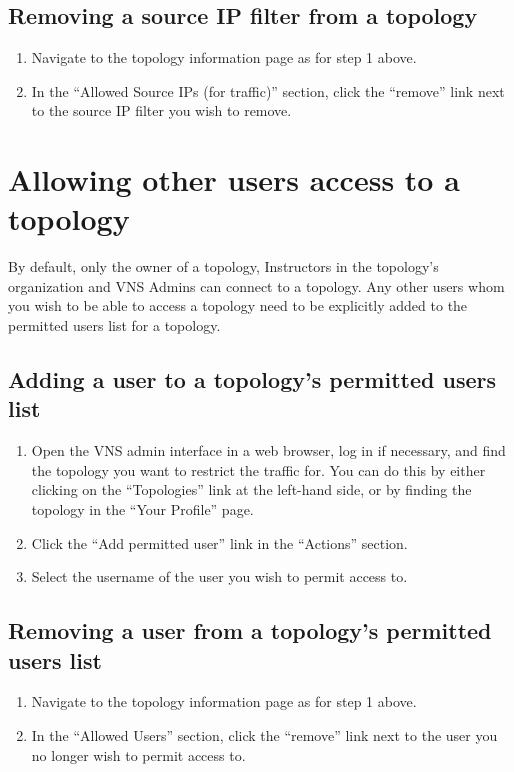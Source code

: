 \documentclass[a4paper,12pt]{report}
\begin{document}
\subsection{Removing a source IP filter from a topology}
\begin{enumerate}
\item Navigate to the topology information page as for step 1 above.
\item In the ``Allowed Source IPs (for traffic)'' section, click the ``remove'' link next to the source IP filter you wish to remove.
\end{enumerate}

\section{Allowing other users access to a topology}
By default, only the owner of a topology, Instructors in the topology's organization and VNS Admins can connect to a topology.  Any other users whom you wish to be able to access a topology need to be explicitly added to the permitted users list for a topology.

\subsection{Adding a user to a topology's permitted users list}
\begin{enumerate}
\item Open the VNS admin interface in a web browser, log in if necessary, and find the topology you want to restrict the traffic for.  You can do this by either clicking on the ``Topologies'' link at the left-hand side, or by finding the topology in the ``Your Profile'' page.
\item Click the ``Add permitted user'' link in the ``Actions'' section.
\item Select the username of the user you wish to permit access to.
\end{enumerate}

\subsection{Removing a user from a topology's permitted users list}
\begin{enumerate}
\item Navigate to the topology information page as for step 1 above.
\item In the ``Allowed Users'' section, click the ``remove'' link next to the user you no longer wish to permit access to.
\end{enumerate}
\end{document}
